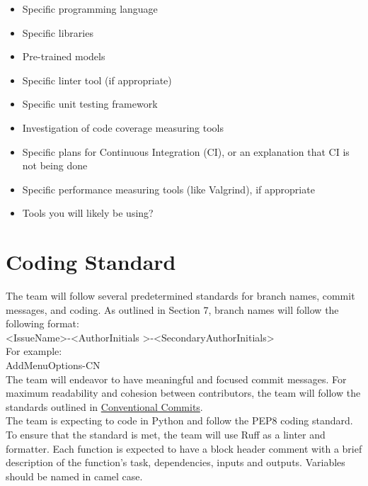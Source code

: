 \documentclass{article}
\begin{document}
\begin{itemize}
\item Specific programming language
\item Specific libraries
\item Pre-trained models
\item Specific linter tool (if appropriate)
\item Specific unit testing framework
\item Investigation of code coverage measuring tools
\item Specific plans for Continuous Integration (CI), or an explanation that CI
  is not being done
\item Specific performance measuring tools (like Valgrind), if
  appropriate
\item Tools you will likely be using?
\end{itemize}


\section{Coding Standard}

The team will follow several predetermined standards for branch names, commit messages, and coding. As outlined in Section 7, branch names will follow the following format:  \\

\textless Issue\textunderscore Name\textgreater-\textless AuthorInitials \textgreater-\textless SecondaryAuthorInitials\textgreater \\

For example:  \\

Add\textunderscore Menu\textunderscore Options-CN \\

The team will endeavor to have meaningful and focused commit messages. For maximum readability and cohesion between contributors, the team will follow the standards outlined in 
\href{https://www.conventionalcommits.org/en/v1.0.0/} {Conventional Commits}.  \\

The team is expecting to code in Python and follow the PEP8 coding standard. To ensure that the standard is met, the team will use Ruff as a linter and formatter. Each function is expected to have a block header comment with a brief description of the function’s task, dependencies, inputs and outputs. Variables should be named in camel case.  \\
\end{document}
